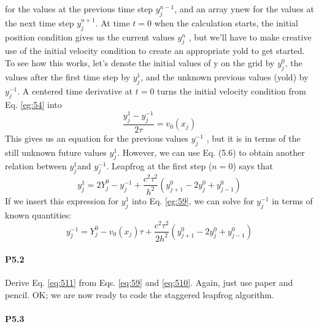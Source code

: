 \documentclass{book}
\theoremstyle{plain}
\theoremstyle{definition}
\numberwithin{exm}{chapter}
\theoremstyle{remark}
\theoremstyle{summary}
\theoremstyle{overview}
\begin{document}
for the values at the previous time step $ y_j^{n-1}$, and an array ynew for the values
at the next time step $ y_j^{n+1}$. At time $t = 0$ when the calculation starts, the initial
position condition gives us the current values $ y_j^n$ , but we\rq ll have to make creative
use of the initial velocity condition to create an appropriate yold to get started.
To see how this works, let\rq s denote the initial values of y on the grid by $ y_j^0 $, the
values after the first time step by $ y_j^{1} $, and the unknown previous values (yold) by
$ y_j^{-1} $. A centered time derivative at $t = 0$ turns the initial velocity condition from
Eq. \eqref{eg:54} into
\begin{equation}\label{eq:59}
\frac{y_j^1 - y_j^{-1}}{2 \tau} = v_0(x_j)
\end{equation}
This gives us an equation for the previous values $y_j^{-1}$ , but it is in terms of the
still unknown future values $y_j^{1}$. However, we can use Eq. (5.6) to obtain another
relation between $y_j^{1}$and $y_j^{-1}$. Leapfrog at the first step ($n = 0$) says that
\begin{equation}\label{eq:510}
y_j^1 = 2Y^0_j - y_j^{-1} + \frac{c^2 \tau^2}{h^2}(y^0_{j+1}-2y^0_j+y^0_{j-1})
\end{equation}
If we insert this expression for $y^1_j$ into Eq. \eqref{eg:59}, we can solve for $y^{-1}_j $ in terms of
known quantities:
\begin{equation}\label{eq:511}
y_j^{-1} = Y^0_j - v_0(x_j)\tau + \frac{c^2 \tau^2}{2h^2}(y^0_{j+1}-2y^0_j+y^0_{j-1})
\end{equation}

\paragraph*{P5.2}Derive Eq. \eqref{eq:511} from Eqs. \eqref{eq:59} and \eqref{eq:510}. Again, just use paper and pencil.
OK; we are now ready to code the staggered leapfrog algorithm.
\paragraph*{P5.3}
\end{document}
